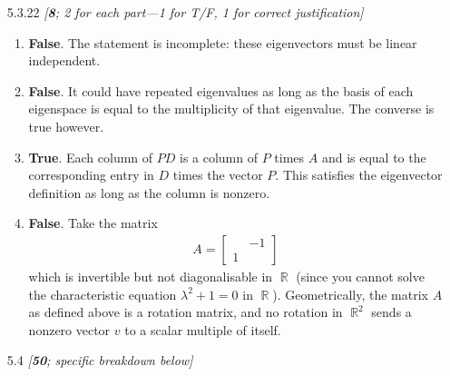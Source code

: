 \documentclass{amsart}
\theoremstyle{definition}
\theoremstyle{definition}
\DeclareMathOperator{\R}{\mathbb{R}}
\DeclareMathOperator{\1}{\mathbbm{1}}
\begin{document}
\begin{enumerate}[itemsep = 2mm]
		
		\item[5.3.22] \textit{[\textbf{8}; 2 for each part---1 for T/F, 1 for correct justification]}
		
		\begin{enumerate}
			\item \textbf{False}. The statement is incomplete: these eigenvectors must be linear independent.
			
			
			\item \textbf{False}. It could have repeated eigenvalues as long as the basis of each eigenspace is equal to the multiplicity of that eigenvalue. The converse is true however.
			
			
			
			\item \textbf{True}. Each column of $PD$ is a column of $P$ times $A$ and is equal to the corresponding entry in $D$ times the vector $P$. This satisfies the eigenvector definition as long as the column is nonzero.
			
			
			
			\item \textbf{False}. Take the matrix
			\begin{align*}
			A = \begin{bmatrix}
			\phantom{0} & -1 \\ 1  &
			\end{bmatrix}
			\end{align*}
			which is invertible but not diagonalisable in $\R$ (since you cannot solve the characteristic equation $\lambda^2 + 1 = 0$ in $\R$). Geometrically, the matrix $A$ as defined above is a rotation matrix, and no rotation in $\R^2$ sends a nonzero vector $v$ to a scalar multiple of itself. 
		\end{enumerate}
		
		\item[5.4] \textit{[\textbf{50}; specific breakdown below]}
		

\end{enumerate}
\end{document}
